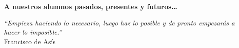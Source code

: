 %

% 
% 

\thispagestyle{empty}

\begin{flushright}

  \vspace*{\fill}

  \textbf{A nuestros alumnos pasados, presentes y futuros\ldots}\\

  \vspace{3cm}

  \emph{``Empieza haciendo lo necesario, luego haz lo posible y de
    pronto empezarás a hacer lo imposible.''}\\ Francisco de Asís

\end{flushright}  

\vspace{4cm}
\vspace*{\fill}




